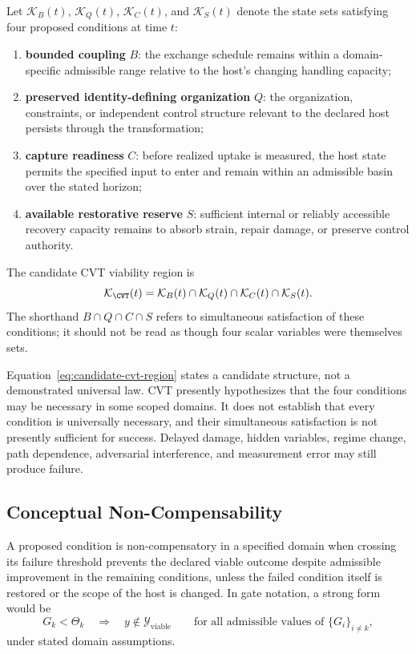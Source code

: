 Let \(\mathcal K_B(t)\), \(\mathcal K_Q(t)\), \(\mathcal K_C(t)\), and \(\mathcal K_S(t)\) denote the state sets satisfying four proposed conditions at time \(t\):

\begin{enumerate}[label=(\roman*)]
    \item \textbf{bounded coupling} \(B\): the exchange schedule remains within a domain-specific admissible range relative to the host's changing handling capacity;
    \item \textbf{preserved identity-defining organization} \(Q\): the organization, constraints, or independent control structure relevant to the declared host persists through the transformation;
    \item \textbf{capture readiness} \(C\): before realized uptake is measured, the host state permits the specified input to enter and remain within an admissible basin over the stated horizon;
    \item \textbf{available restorative reserve} \(S\): sufficient internal or reliably accessible recovery capacity remains to absorb strain, repair damage, or preserve control authority.
\end{enumerate}

The candidate CVT viability region is
\begin{equation}
    \mathcal K_{\CVT}(t)
    =
    \mathcal K_B(t)
    \cap
    \mathcal K_Q(t)
    \cap
    \mathcal K_C(t)
    \cap
    \mathcal K_S(t).
    \label{eq:candidate-cvt-region}
\end{equation}
The shorthand \(B\cap Q\cap C\cap S\) refers to simultaneous satisfaction of these conditions; it should not be read as though four scalar variables were themselves sets.

Equation~\eqref{eq:candidate-cvt-region} states a candidate structure, not a demonstrated universal law. CVT presently hypothesizes that the four conditions may be necessary in some scoped domains. It does not establish that every condition is universally necessary, and their simultaneous satisfaction is not presently sufficient for success. Delayed damage, hidden variables, regime change, path dependence, adversarial interference, and measurement error may still produce failure.

\subsection{Conceptual Non-Compensability}

A proposed condition is non-compensatory in a specified domain when crossing its failure threshold prevents the declared viable outcome despite admissible improvement in the remaining conditions, unless the failed condition itself is restored or the scope of the host is changed. In gate notation, a strong form would be
\begin{equation}
    G_k < \Theta_k
    \quad\Longrightarrow\quad
    y \notin \mathcal Y_{\mathrm{viable}}
    \qquad
    \text{for all admissible values of }\{G_i\}_{i\neq k},
    \label{eq:strong-noncompensability}
\end{equation}
under stated domain assumptions.

